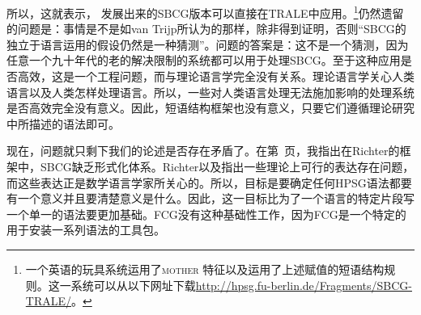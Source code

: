 所以，这就表示，\citet{Sag2012a} 发展出来的SBCG版本可以直接在TRALE中应用。\footnote{%
一个英语的玩具系统运用了\textsc{mother} 特征以及运用了上述赋值的短语结构规则。这一系统可以从以下网址下载\url{http://hpsg.fu-berlin.de/Fragments/SBCG-TRALE/}。%
}仍然遗留的问题是：事情是不是如van Trijp所认为的那样，除非得到证明，否则“SBCG的独立于语言运用的假设仍然是一种猜测”。问题的答案是：这不是一个猜测，因为任意一个九十年代的老的解决限制的系统都可以用于处理SBCG。至于这种应用是否高效，这是一个工程问题，而与理论语言学完全没有关系。理论语言学关心人类语言以及人类怎样处理语言。所以，一些对人类语言处理无法施加影响的处理系统是否高效完全没有意义。因此，短语结构框架也没有意义，只要它们遵循理论研究中所描述的语法即可。

现在，问题就只剩下我们的论述是否存在矛盾了。在第~\pageref{page-sbcg-formalization}页，我指出在Richter的框架\citep{Richter2004a-u}中，SBCG缺乏形式化体系。Richter以及\citet{LM2006a}指出一些理论上可行的表达存在问题，而这些表达正是数学语言学家所关心的。所以，目标是要确定任何HPSG语法都要有一个意义并且要清楚意义是什么。因此，这一目标比为了一个语言的特定片段写一个单一的语法要更加基础。FCG没有这种基础性工作，因为FCG是一个特定的用于安装一系列语法的工具包。

